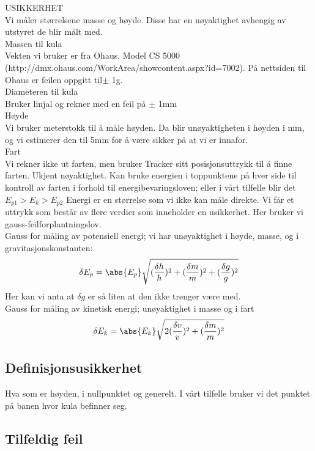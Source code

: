 USIKKERHET\\
Vi måler størrelsene masse og høyde. Disse har en nøyaktighet avhengig av utstyret de blir målt med.\\ 
Massen til kula\\
Vekten vi bruker er fra Ohaus, Model CS 5000 (http://dmx.ohaus.com/WorkArea/showcontent.aspx?id=7002). På nettsiden til Ohaus er feilen oppgitt til$\pm$ 1g.\\
Diameteren til kula\\
Bruker linjal og rekner med en feil på $\pm$ 1mm\\
Høyde\\
Vi bruker meterstokk til å måle høyden. Da blir unøyaktigheten i høyden i mm, og vi estimerer den til 5mm for å være sikker på at vi er innafor.\\
Fart\\
Vi rekner ikke ut farten, men bruker Tracker sitt posisjonsuttrykk til å finne farten. Ukjent nøyaktighet. Kan bruke energien i toppunktene på hver side til kontroll av farten i forhold til energibevaringsloven; eller i vårt tilfelle blir det $E_{p1} > E_k > E_{p2}$          %
Energi er en størrelse som vi ikke kan måle direkte. Vi får et uttrykk som består av flere verdier som inneholder en usikkerhet. Her bruker vi gauss-feilforplantningslov.\\
Gauss for måling av potensiell energi; vi har unøyaktighet i høyde, masse, og i gravitasjonskonstanten: $$\delta E_p =  \abs{E_p} \sqrt{(\frac{\delta h}{h})^2+(\frac{\delta m}{m})^2 + (\frac{\delta g}{g})^2}$$ 
Her kan vi anta at $\delta g$ er så liten at den ikke trenger være med.\\ 
Gauss for måling av kinetisk energi; unøyaktighet i masse og i fart  $$\delta E_k =  \abs{E_k} \sqrt{2(\frac{\delta v}{v})^2+(\frac{\delta m}{m})^2}$$  

\subsection{Definisjonsusikkerhet}
Hva som er høyden, i nullpunktet og generelt. I vårt tilfelle bruker vi det punktet på banen hvor kula befinner seg.\\

\subsection{Tilfeldig feil}

